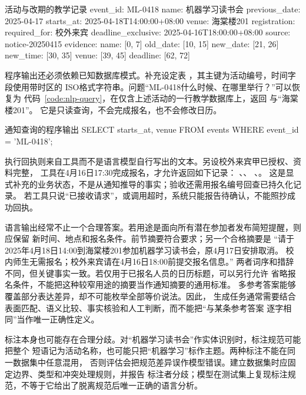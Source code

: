 \begin{codeblock}[label={code:nlp-event-record}]{活动与改期的教学记录}
event_id: ML-0418
name: 机器学习读书会
previous_date: 2025-04-17
starts_at: 2025-04-18T14:00:00+08:00
venue: 海棠楼201
registration:
  required_for: 校外来宾
  deadline_exclusive: 2025-04-16T18:00:00+08:00
source: notice-20250415
evidence:
  name: [0, 7]
  old_date: [10, 15]
  new_date: [21, 26]
  new_time: [30, 35]
  venue: [39, 45]
  deadline: [62, 72]
\end{codeblock}

程序输出还必须依赖已知数据库模式。补充设定表
，其主键为活动编号，时间字段使用带时区的
ISO格式字符串。问题“ML-0418什么时候、在哪里举行？”可以恢复为
代码~\ref{code:nlp-query}，在仅含上述活动的一行教学数据库上，返回
与“海棠楼201”。
它是只读查询，不会完成报名，也不会修改日历。

\begin{codeblock}[language=SQL,label={code:nlp-query}]{通知查询的程序输出}
SELECT starts_at, venue
FROM events
WHERE event_id = 'ML-0418';
\end{codeblock}

执行回执则来自工具而不是语言模型自行写出的文本。另设校外来宾甲已授权、资料完整，
工具在4月16日17:30完成报名，才允许返回如下记录：
、、
、。
这是显式补充的业务状态，不是从通知推导的事实；验收还需用报名编号回查已持久化记录。
若工具只说“已接收请求”，或调用超时，系统只能报告待确认，不能照抄成功回执。

语言输出经常不止一个合理答案。若用途是面向所有潜在参加者发布简短提醒，则应保留
新时间、地点和报名条件。前节摘要符合要求；另一个合格摘要是
“请于2025年4月18日14:00到海棠楼201参加机器学习读书会，原4月17日安排取消。
校内师生无需报名；校外来宾请在4月16日18:00前提交报名信息。”
两者词序和措辞不同，但关键事实一致。若仅用于已报名人员的日历标题，可以另行允许
省略报名条件，不能把这种较窄用途的摘要当作通知摘要的通用标准。
多参考答案能够覆盖部分表达差异，却不可能枚举全部等价说法。因此，
生成任务通常需要结合表面匹配、语义比较、事实核验和人工判断，而不能把“与某条参考答案
逐字相同”当作唯一正确性定义。

标注本身也可能存在合理分歧。对“机器学习读书会”作实体识别时，标注规范可能把整个
短语记为活动名称，也可能只把“机器学习”标作主题。两种标注不能在同一数据集中任意混用，
否则评估会把规范差异误作模型错误。建立数据集时应固定边界、类型和冲突处理规则，并报告
标注者分歧；模型在测试集上复现标注规范，不等于它给出了脱离规范后唯一正确的语言分析。

